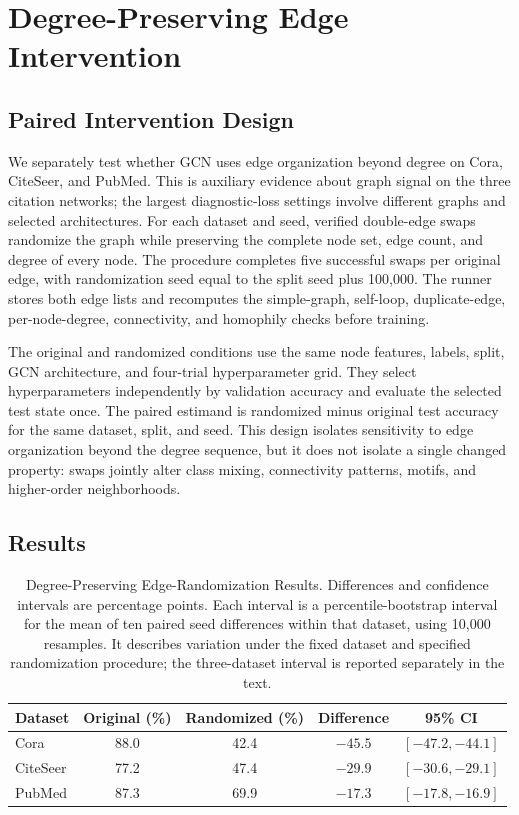 \section{Degree-Preserving Edge Intervention}
\label{sec:edge_intervention}

\subsection{Paired Intervention Design}

We separately test whether GCN uses edge organization beyond degree on Cora, CiteSeer, and PubMed. This is auxiliary evidence about graph signal on the three citation networks; the largest diagnostic-loss settings involve different graphs and selected architectures. For each dataset and seed, verified double-edge swaps randomize the graph while preserving the complete node set, edge count, and degree of every node. The procedure completes five successful swaps per original edge, with randomization seed equal to the split seed plus 100,000. The runner stores both edge lists and recomputes the simple-graph, self-loop, duplicate-edge, per-node-degree, connectivity, and homophily checks before training.

The original and randomized conditions use the same node features, labels, split, GCN architecture, and four-trial hyperparameter grid. They select hyperparameters independently by validation accuracy and evaluate the selected test state once. The paired estimand is randomized minus original test accuracy for the same dataset, split, and seed. This design isolates sensitivity to edge organization beyond the degree sequence, but it does not isolate a single changed property: swaps jointly alter class mixing, connectivity patterns, motifs, and higher-order neighborhoods.

\subsection{Results}

\begin{table}[t]
\centering
\caption{Degree-Preserving Edge-Randomization Results. Differences and confidence intervals are percentage points. Each interval is a percentile-bootstrap interval for the mean of ten paired seed differences within that dataset, using 10,000 resamples. It describes variation under the fixed dataset and specified randomization procedure; the three-dataset interval is reported separately in the text.}
\label{tab:degree_intervention}
\small
\begin{tabular}{@{}lcccc@{}}
\toprule
Dataset & Original (\%) & Randomized (\%) & Difference & 95\% CI \\
\midrule
Cora & 88.0 & 42.4 & $-45.5$ & $[-47.2,-44.1]$ \\
CiteSeer & 77.2 & 47.4 & $-29.9$ & $[-30.6,-29.1]$ \\
PubMed & 87.3 & 69.9 & $-17.3$ & $[-17.8,-16.9]$ \\
\bottomrule
\end{tabular}
\end{table}

